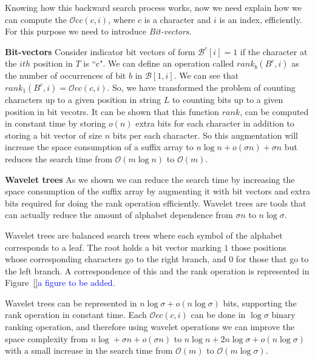 \documentclass[11pt]{article}
\newcommand{\TODO}[1]{\textcolor{blue}{#1}}
\begin{document}
Knowing how this backward search process works, now we need explain how we can compute the $\mathcal{O}cc(c,i)$, where $c$ is a character and $i$ is an index, efficiently. For this purpose we need to introduce \emph{Bit-vectors}.

\textbf{Bit-vectors} Consider indicator bit vectors of form $\mathcal{B}^c[i]=1$ if the character at the $ith$ position in $T$ is ``c". We can define an operation called \emph{$rank_{b}(B^c,i)$} as the number of occurrences of bit $b$ in $\mathcal{B}[1,i]$. We can see that \emph{$rank_{1}(B^c,i)=\mathcal{O}cc(c,i)$}. So, we have transformed the problem of counting characters up to a given position in string $L$ to counting bits up to a given position in bit vecotrs. It can be shown that this function $rank$, can be computed in constant time by storing $o(n)$ extra bits for each character in addition to storing a bit vector of size $n$ bits per each character. So this augmentation will increase the space consumption of a suffix array to $n\log n + o(\sigma n)+\sigma n$ but reduces the search time from $\mathcal{O}(m\log n)$ to $\mathcal{O}(m)$.

\textbf{Wavelet trees}
As we shown we can reduce the search time by increasing the space consumption of the suffix array by augmenting it with bit vectors and extra bits required for doing the rank operation efficiently. Wavelet trees are tools that can actually reduce the amount of alphabet dependence from $\sigma n$ to $n\log \sigma$. 

Wavelet trees are balanced search trees where each symbol of the alphabet corresponds to a leaf. The root holds a bit vector marking $1$ those positions whose corresponding characters go to the right branch, and $0$ for those that go to the left branch. A correspondence of this and the rank operation is represented in Figure~\ref{}\TODO{a figure to be added}. 

Wavelet trees can be represented in $n\log \sigma + o(n\log \sigma)$ bits, supporting the rank operation in constant time. Each $\mathcal{O}cc(c,i)$ can be done in $\log \sigma$ binary ranking operation, and therefore using wavelet operations we can improve the space complexity from $n\log + \sigma n + o(\sigma n)$ to $n\log n + 2n\log\sigma + o(n\log\sigma)$ with a small increase in the search time from $\mathcal{O}(m)$ to $\mathcal{O}(m\log\sigma)$. 
\end{document}
